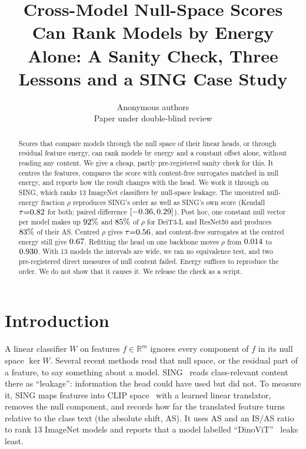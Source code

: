 \documentclass[10pt]{article}
\title{Cross-Model Null-Space Scores Can Rank Models by Energy Alone: A Sanity Check, Three Lessons and a SING Case Study}
\author{\name Anonymous authors\\ \addr Paper under double-blind review}
\begin{document}
\maketitle

\begin{abstract}
Scores that compare models through the null space of their linear heads, or through residual feature energy, can rank models by energy and a constant offset alone, without reading any content.
We give a cheap, partly pre-registered sanity check for this. It centres the features, compares the score with content-free surrogates matched in null energy, and reports how the result changes with the head.
We work it through on SING, which ranks 13 ImageNet classifiers by null-space leakage.
The uncentred null-energy fraction $\rho$ reproduces SING's order as well as SING's own score (Kendall $\tau{=}0.82$ for both; paired difference $[-0.36,0.29]$).
Post hoc, one constant null vector per model makes up $92\%$ and $85\%$ of $\rho$ for DeiT3-L and ResNet50 and produces $83\%$ of their AS. Centred $\rho$ gives $\tau{=}0.56$, and content-free surrogates at the centred energy still give $0.67$. Refitting the head on one backbone moves $\rho$ from $0.014$ to $0.930$.
With 13 models the intervals are wide, we ran no equivalence test, and two pre-registered direct measures of null content failed. Energy suffices to reproduce the order. We do not show that it causes it.
We release the check as a script.
\end{abstract}

\section{Introduction}
\label{sec:intro}
A linear classifier $W$ on features $f\in\mathbb{R}^m$ ignores every component of $f$ in its null space $\ker W$.
Several recent methods read that null space, or the residual part of a feature, to say something about a model.
SING~\citep{sing2026} reads class-relevant content there as ``leakage'': information the head could have used but did not.
To measure it, SING maps features into CLIP space~\citep{clip2021} with a learned linear translator, removes the null component, and records how far the translated feature turns relative to the class text (the absolute shift, AS).
It uses AS and an IS/AS ratio to rank 13 ImageNet models and reports that a model labelled ``DinoViT''~\citep{dino2021} leaks least.
\end{document}
